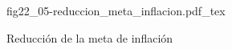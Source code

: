 \begin{figure}[h]
\centering
\def\svgwidth{0.5\textwidth}
{fig22_05-reduccion_meta_inflacion.pdf_tex}
\caption{Reducción de la meta de inflación}
\label{fig22_05-reduccion_meta_inflacion}
\end{figure}